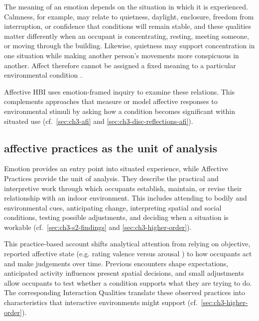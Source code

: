 The meaning of an emotion depends on the situation in which it is
experienced. Calmness, for example, may relate to quietness, daylight,
enclosure, freedom from interruption, or confidence that conditions
will remain stable, and these qualities matter differently when an
occupant is concentrating, resting, meeting someone, or moving through
the building. Likewise, quietness may support concentration in one
situation while making another person's movements more conspicuous in
another. Affect therefore cannot be assigned a fixed meaning to a
particular environmental condition \cite{feldman2022affect,barrett2022context,boehner2007emotion}.

Affective HBI uses emotion-framed inquiry to examine these relations.
This complements approaches that measure or model affective responses
to environmental stimuli \cite{mehrabian1974approach,russell1980circumplex,
bower2019impact,picard1999affective,gao2020n} by asking how a condition becomes significant within situated use
\cite{boehner2005affect,boehner2007emotion, lottridge2011affective} (cf.~\autoref{sec:ch3-afi} and \autoref{sec:ch3-disc-reflections-afi}).


\subsection{affective practices as the unit of analysis}
\label{subsec:affective-practices}

Emotion provides an entry point into situated experience, while
Affective Practices provide the unit of analysis. They describe the
practical and interpretive work through which occupants establish,
maintain, or revise their relationship with an indoor environment.
This includes attending to bodily and environmental cues, anticipating
change, interpreting spatial and social conditions, testing possible
adjustments, and deciding when a situation is workable
(cf.~\autoref{sec:ch3-s2-findings} and
\autoref{sec:ch3-higher-order}).

This practice-based account shifts analytical attention from relying on objective, reported affective state (e.g. rating valence versus arousal \cite{raodriving}) to how occupants act and make judgements over time. Previous encounters shape expectations, anticipated activity influences
present spatial decisions, and small adjustments allow occupants to test
whether a condition supports what they are trying to do. The
corresponding Interaction Qualities translate these observed practices
into characteristics that interactive environments might support
(cf.~\autoref{sec:ch3-higher-order}).


